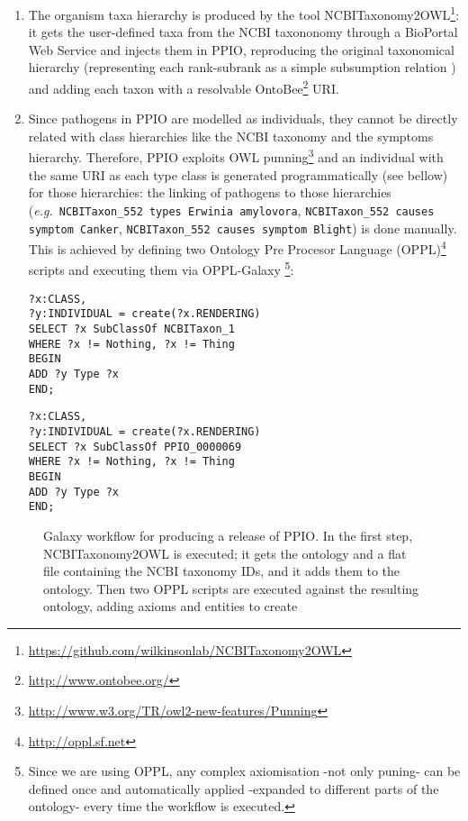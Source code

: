 \documentclass[sw]{iosart2c}
\newcommand{\myurl}[1]{\footnote{\url{#1}}}
\newcommand{\eg}{\emph{e.g.}\xspace}
\newcommand{\con}[1]{\texttt{#1}\xspace}
\begin{document}
\begin{enumerate}

\item The organism taxa hierarchy is produced by the tool NCBITaxonomy2OWL\myurl{https://github.com/wilkinsonlab/NCBITaxonomy2OWL}: it gets the user-defined taxa from the NCBI taxononomy through a BioPortal Web Service \cite{bioportal} and injects them in PPIO, reproducing the original taxonomical hierarchy (representing each rank-subrank as a simple subsumption relation \cite{taxa_ismb_2008}) and adding each taxon with a resolvable OntoBee\myurl{http://www.ontobee.org/} URI.

\item Since pathogens in PPIO are modelled as individuals, they cannot be directly related with class hierarchies like the NCBI taxonomy and the symptoms hierarchy. Therefore, PPIO exploits OWL punning\myurl{http://www.w3.org/TR/owl2-new-features/Punning} and an individual with the same URI as each type class is generated programmatically (see bellow) for those hierarchies: the linking of pathogens to those hierarchies (\eg~\con{NCBITaxon\_552 types Erwinia amylovora}, \con{NCBITaxon\_552 causes symptom Canker}, \con{NCBITaxon\_552 causes symptom Blight}) is done manually. This is achieved by defining two Ontology Pre Procesor Language (OPPL)\myurl{http://oppl.sf.net} scripts and executing them via OPPL-Galaxy \cite{OPPL-Galaxy-JBMS}\footnote{Since we are using OPPL, any complex axiomisation -not only puning- can be defined once and automatically applied -expanded to different parts of the ontology- every time the workflow is executed.}:

{\small 
\begin{verbatim}
?x:CLASS,
?y:INDIVIDUAL = create(?x.RENDERING)
SELECT ?x SubClassOf NCBITaxon_1
WHERE ?x != Nothing, ?x != Thing
BEGIN
ADD ?y Type ?x
END;
\end{verbatim}
}

{\small 
\begin{verbatim}
?x:CLASS,
?y:INDIVIDUAL = create(?x.RENDERING)
SELECT ?x SubClassOf PPIO_0000069
WHERE ?x != Nothing, ?x != Thing
BEGIN
ADD ?y Type ?x
END;
\end{verbatim}
}


\end{enumerate}

\begin{figure*}
\caption{Galaxy workflow for producing a release of PPIO. In the first step, NCBITaxonomy2OWL is executed; it gets the ontology and a flat file containing the NCBI taxonomy IDs, and it adds them to the ontology. Then two OPPL scripts are executed against the resulting ontology, adding axioms and entities to create }\label{fig:galaxy-workflow}
\end{figure*}
\end{document}
